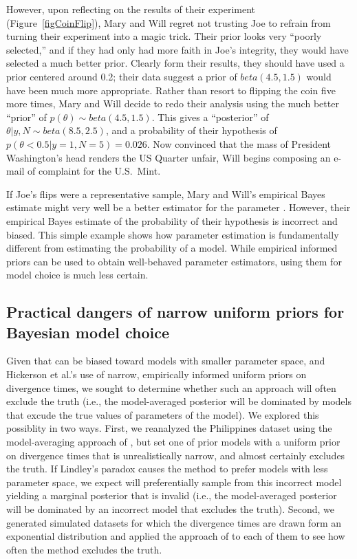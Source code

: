 \documentclass[letterpaper,12pt]{article}
\begin{document}
\begin{linenumbers}
However, upon reflecting on the results of their experiment
(Figure~\ref{figCoinFlip}), Mary and Will regret not trusting Joe to refrain
from turning their experiment into a magic trick.
Their prior looks very ``poorly selected,'' and if they had only
had more faith in Joe's integrity, they would have selected a much better
prior. Clearly form their results, they should have used a prior centered
around 0.2; their data suggest a prior of $beta(4.5, 1.5)$ would have been
much more appropriate.
Rather than resort to flipping the coin five more times, Mary and Will decide
to redo their analysis using the much better ``prior'' of $p(\theta) \sim
beta(4.5, 1.5)$.
This gives a ``posterior'' of $\theta|y,N \sim beta(8.5, 2.5)$, and a
probability of their hypothesis of $p(\theta < 0.5 | y=1, N=5) = 0.026$.
Now convinced that the mass of President Washington's head renders the US
Quarter unfair, Will begins composing an e-mail of complaint for the U.S.\
Mint.

If Joe's flips were a representative sample, Mary and Will's empirical Bayes
estimate might very well be a better estimator for the parameter \myTheta{}.
However, their empirical Bayes estimate of the probability of their hypothesis
is incorrect and biased.
This simple example shows how parameter estimation is fundamentally different
from estimating the probability of a model.
While empirical informed priors can be used to obtain well-behaved parameter
estimators, using them for model choice is much less certain.


\subsection*{Practical dangers of narrow uniform priors for Bayesian model
choice}
Given that \msb can be biased toward models with smaller parameter space, and
Hickerson et al.'s \citeyear{Hickerson2013} use of narrow, empirically informed
uniform priors on divergence times, we sought to determine whether such an
approach will often exclude the truth (i.e., the model-averaged posterior will
be dominated by models that excude the true values of parameters of the model).
We explored this possiblity in two ways.
First, we reanalyzed the Philippines dataset using the model-averaging approach
of \citet{Hickerson2013}, but set one of prior models with a uniform prior on
divergence times that is unrealistically narrow, and almost certainly excludes
the truth.
If Lindley's paradox causes the method to prefer models with less parameter
space, we expect \msb will preferentially sample from this incorrect model
yielding a marginal posterior that is invalid (i.e., the model-averaged
posterior will be dominated by an incorrect model that excludes the truth).
Second, we generated simulated datasets for which the divergence times are
drawn form an exponential distribution and applied the approach of
\citet{Hickerson2013} to each of them to see how often the method excludes the
truth.


\end{linenumbers}
\end{document}
